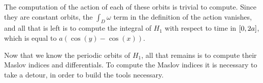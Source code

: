 The computation of the action of each of these orbits is trivial to compute. Since they are constant orbits, the $\int_D \omega$ term in the definition of the action vanishes, and all that is left is to compute the integral of $H_1$ with respect to time in $\interval 0 {2a}$, which is equal to $a(\cos(y) - \cos(x))$.

Now that we know the periodic orbits of $H_1$, all that remains is to compute their Maslov indices and differentials. To compute the Maslov indices it is necessary to take a detour, in order to build the tools necessary.